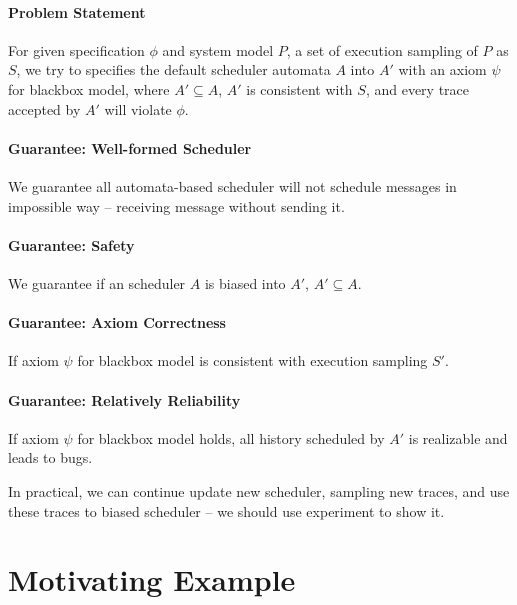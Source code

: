\paragraph{Problem Statement} For given specification $\phi$ and system model $P$, a set of execution sampling of $P$ as $S$, we try to specifies the default scheduler automata $A$ into $A'$ with an axiom $\psi$ for blackbox model, where $A' \subseteq A$, $A'$ is consistent with $S$, and every trace accepted by $A'$ will violate $\phi$.

\paragraph{Guarantee: Well-formed Scheduler} We guarantee all automata-based scheduler will not schedule messages in impossible way -- receiving message without sending it.

\paragraph{Guarantee: Safety} We guarantee if an scheduler $A$ is biased into $A'$, $A' \subseteq A$. 

\paragraph{Guarantee: Axiom Correctness} If axiom $\psi$ for blackbox model is consistent with execution sampling $S'$.

\paragraph{Guarantee: Relatively Reliability} If axiom $\psi$ for blackbox model holds, all history scheduled by $A'$ is realizable and leads to bugs.

In practical, we can continue update new scheduler, sampling new traces, and use these traces to biased scheduler -- we should use experiment to show it.

\section{Motivating Example}

